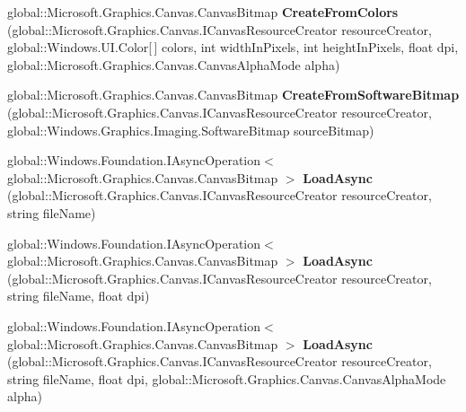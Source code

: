 \begin{DoxyCompactItemize}
\mbox{\label{interface_microsoft_1_1_graphics_1_1_canvas_1_1_i_canvas_bitmap_statics_ac23c845c20b604aa3826acb7f0cacc6d}} 
global\+::\+Microsoft.\+Graphics.\+Canvas.\+Canvas\+Bitmap {\bfseries Create\+From\+Colors} (global\+::\+Microsoft.\+Graphics.\+Canvas.\+I\+Canvas\+Resource\+Creator resource\+Creator, global\+::\+Windows.\+U\+I.\+Color\mbox{[}$\,$\mbox{]} colors, int width\+In\+Pixels, int height\+In\+Pixels, float dpi, global\+::\+Microsoft.\+Graphics.\+Canvas.\+Canvas\+Alpha\+Mode alpha)
\item 
\mbox{\label{interface_microsoft_1_1_graphics_1_1_canvas_1_1_i_canvas_bitmap_statics_a16c2a6fccb7e921aec8eea3c8e35b5a0}} 
global\+::\+Microsoft.\+Graphics.\+Canvas.\+Canvas\+Bitmap {\bfseries Create\+From\+Software\+Bitmap} (global\+::\+Microsoft.\+Graphics.\+Canvas.\+I\+Canvas\+Resource\+Creator resource\+Creator, global\+::\+Windows.\+Graphics.\+Imaging.\+Software\+Bitmap source\+Bitmap)
\item 
\mbox{\label{interface_microsoft_1_1_graphics_1_1_canvas_1_1_i_canvas_bitmap_statics_a1dc1e26ac69fc5c7772684bf25dfcde8}} 
global\+::\+Windows.\+Foundation.\+I\+Async\+Operation$<$ global\+::\+Microsoft.\+Graphics.\+Canvas.\+Canvas\+Bitmap $>$ {\bfseries Load\+Async} (global\+::\+Microsoft.\+Graphics.\+Canvas.\+I\+Canvas\+Resource\+Creator resource\+Creator, string file\+Name)
\item 
\mbox{\label{interface_microsoft_1_1_graphics_1_1_canvas_1_1_i_canvas_bitmap_statics_a375deeaa1de3b96de707441a0bdbfc64}} 
global\+::\+Windows.\+Foundation.\+I\+Async\+Operation$<$ global\+::\+Microsoft.\+Graphics.\+Canvas.\+Canvas\+Bitmap $>$ {\bfseries Load\+Async} (global\+::\+Microsoft.\+Graphics.\+Canvas.\+I\+Canvas\+Resource\+Creator resource\+Creator, string file\+Name, float dpi)
\item 
\mbox{\label{interface_microsoft_1_1_graphics_1_1_canvas_1_1_i_canvas_bitmap_statics_a2a7be4f3ca0b8f566402d4f3fdbe3975}} 
global\+::\+Windows.\+Foundation.\+I\+Async\+Operation$<$ global\+::\+Microsoft.\+Graphics.\+Canvas.\+Canvas\+Bitmap $>$ {\bfseries Load\+Async} (global\+::\+Microsoft.\+Graphics.\+Canvas.\+I\+Canvas\+Resource\+Creator resource\+Creator, string file\+Name, float dpi, global\+::\+Microsoft.\+Graphics.\+Canvas.\+Canvas\+Alpha\+Mode alpha)

\end{DoxyCompactItemize}
